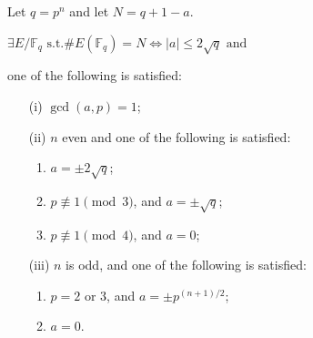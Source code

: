 \documentclass[12pt,handout]{beamer} %
\newcommand{\F}{\mathbb F}
\theoremstyle{definition}
\begin{document}
% 
\begin{frame}[label=current]
\begin{theorem}[Waterhouse]\pause
\label{lem:Water}
 Let $q=p^n$ and let $N = q + 1-a$.\\
\centerline{$\exists E/\F_q\text{ s.t.}\#E(\F_q) = N\Leftrightarrow|a|\le 2\sqrt q\text{ and}$}
 one of the following is satisfied:\pause
\begin{itemize}[<+-| alert@+>]
\item[(i)] $\gcd(a, p) = 1$;
\item[(ii)] $n$ even and one of the following is satisfied:
\begin{enumerate}
  \item $a=\pm 2\sqrt q$;
  \item $p\not\equiv 1 \pmod 3$, and $a = \pm\sqrt q$;
  \item $p\not\equiv 1 \pmod 4$, and $a = 0$;
\end{enumerate}
\item[(iii)] $n$ is odd, and one of the following is satisfied:
 \begin{enumerate}
   \item $p = 2$ or $3$, and $a = \pm p^{(n+1)/2}$;
   \item $a = 0$.
 \end{enumerate}
 \end{itemize}
\end{theorem}
\end{frame}
\end{document}
